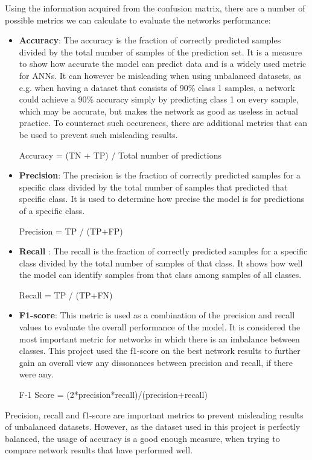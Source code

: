 Using the information acquired from the confusion matrix, there are a number of possible metrics we can calculate to evaluate the networks performance:
\begin{itemize}
    \item \textbf{Accuracy}: The accuracy is the fraction of correctly predicted samples divided by the total number of samples of the prediction set. It is a measure to show how accurate the model can predict data and is a widely used metric for ANNs. It can however be misleading when using unbalanced datasets, as e.g. when having a dataset that consists of 90\% class 1 samples, a network could achieve a 90\% accuracy simply by predicting class 1 on every sample, which may be accurate, but makes the network as good as useless in actual practice. To counteract such occurences, there are additional metrics that can be used to prevent such misleading results.
    
    {
\centering Accuracy = (TN + TP) / Total number of predictions \par
}
    \item \textbf{Precision}: The precision is the fraction of correctly predicted samples for a specific class divided by the total number of samples that predicted that specific class. It is used to determine how precise the model is for predictions of a specific class.

    {
\centering Precision =  TP / (TP+FP) \par
}
    \item \textbf{Recall} : The recall is the fraction of correctly predicted samples for a specific class divided by the total number of samples of that class. It shows how well the model can identify samples from that class among samples of all classes.

    {
\centering Recall =  TP / (TP+FN) \par
}
\item \textbf{F1-score}: This metric is used as a combination of the precision and recall values to evaluate the overall performance of the model. It is considered the most important metric for networks in which there is an imbalance between classes. This project used the f1-score on the best network results to further gain an overall view any dissonances between precision and recall, if there were any.

{
\centering F-1 Score =  (2*precision*recall)/(precision+recall) \par
}
\end{itemize}

Precision, recall and f1-score are important metrics to prevent misleading results of unbalanced datasets. However, as the dataset used in this project is perfectly balanced, the usage of accuracy is a good enough measure, when trying to compare network results that have performed well.